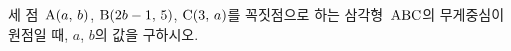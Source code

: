 세 점~$\mathrm{A}(a,\,b)$, $\mathrm{B}(2b-1,\,5)$, $\mathrm{C}(3,\,a)$를 꼭짓점으로 하는 삼각형~$\mathrm{ABC}$의 무게중심이 원점일 때, $a$, $b$의 값을 구하시오.
